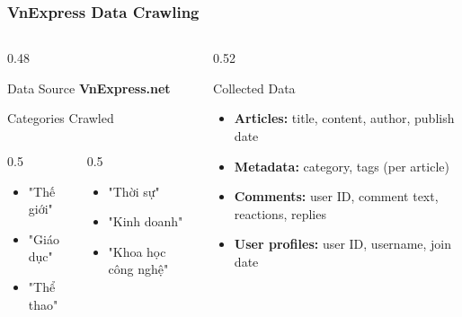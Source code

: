 \documentclass{beamer}
\begin{document}
\begin{frame}
    \frametitle{VnExpress Data Crawling}

    \begin{columns}[T,onlytextwidth]
        \begin{column}{0.48\textwidth}
            \begin{block}{Data Source}
                \textbf{VnExpress.net}
            \end{block}

            \vspace{0.2cm}
            \begin{block}{Categories Crawled}
                \begin{columns}[T,onlytextwidth]
                    \begin{column}{0.5\textwidth}
                        \begin{itemize}
                            \item "Thế giới"
                            \item "Giáo dục"
                            \item "Thể thao"
                        \end{itemize}
                    \end{column}
                    \begin{column}{0.5\textwidth}
                        \begin{itemize}
                            \item "Thời sự"
                            \item "Kinh doanh"
                            \item "Khoa học công nghệ"
                        \end{itemize}
                    \end{column}
                \end{columns}
            \end{block}
        \end{column}

        \begin{column}{0.52\textwidth}
            \begin{block}{Collected Data}
                \begin{itemize}
                    \item \textbf{Articles:} title, content, author, publish date
                    \item \textbf{Metadata:} category, tags (per article)
                    \item \textbf{Comments:} user ID, comment text, reactions, replies
                    \item \textbf{User profiles:} user ID, username, join date
                \end{itemize}
            \end{block}


\end{column}
\end{columns}
\end{frame}
\end{document}
